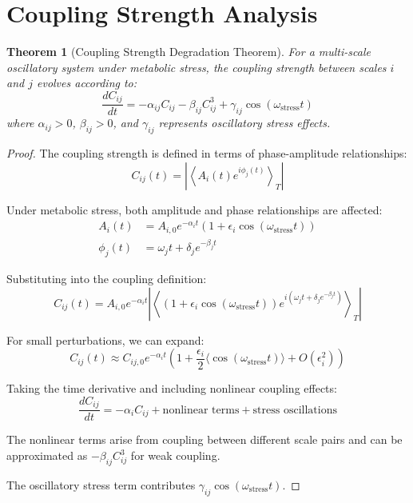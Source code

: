 \documentclass{article}
\newtheorem{theorem}{Theorem}
\begin{document}
\section{Coupling Strength Analysis}

\begin{theorem}[Coupling Strength Degradation Theorem]
For a multi-scale oscillatory system under metabolic stress, the coupling strength between scales $i$ and $j$ evolves according to:
\begin{equation}
\frac{dC_{ij}}{dt} = -\alpha_{ij} C_{ij} - \beta_{ij} C_{ij}^3 + \gamma_{ij} \cos(\omega_{\text{stress}}t)
\end{equation}
where $\alpha_{ij} > 0$, $\beta_{ij} > 0$, and $\gamma_{ij}$ represents oscillatory stress effects.
\end{theorem}

\begin{proof}
The coupling strength is defined in terms of phase-amplitude relationships:
\begin{equation}
C_{ij}(t) = \left|\left\langle A_i(t) e^{i\phi_j(t)} \right\rangle_T\right|
\end{equation}

Under metabolic stress, both amplitude and phase relationships are affected:
\begin{align}
A_i(t) &= A_{i,0} e^{-\alpha_i t}(1 + \epsilon_i \cos(\omega_{\text{stress}}t)) \\
\phi_j(t) &= \omega_j t + \delta_j e^{-\beta_j t}
\end{align}

Substituting into the coupling definition:
\begin{equation}
C_{ij}(t) = A_{i,0} e^{-\alpha_i t} \left|\left\langle (1 + \epsilon_i \cos(\omega_{\text{stress}}t)) e^{i(\omega_j t + \delta_j e^{-\beta_j t})} \right\rangle_T\right|
\end{equation}

For small perturbations, we can expand:
\begin{equation}
C_{ij}(t) \approx C_{ij,0} e^{-\alpha_i t} \left(1 + \frac{\epsilon_i}{2}\langle \cos(\omega_{\text{stress}}t) \rangle + O(\epsilon_i^2)\right)
\end{equation}

Taking the time derivative and including nonlinear coupling effects:
\begin{equation}
\frac{dC_{ij}}{dt} = -\alpha_i C_{ij} + \text{nonlinear terms} + \text{stress oscillations}
\end{equation}

The nonlinear terms arise from coupling between different scale pairs and can be approximated as $-\beta_{ij} C_{ij}^3$ for weak coupling.

The oscillatory stress term contributes $\gamma_{ij} \cos(\omega_{\text{stress}}t)$.
\end{proof}
\end{document}
